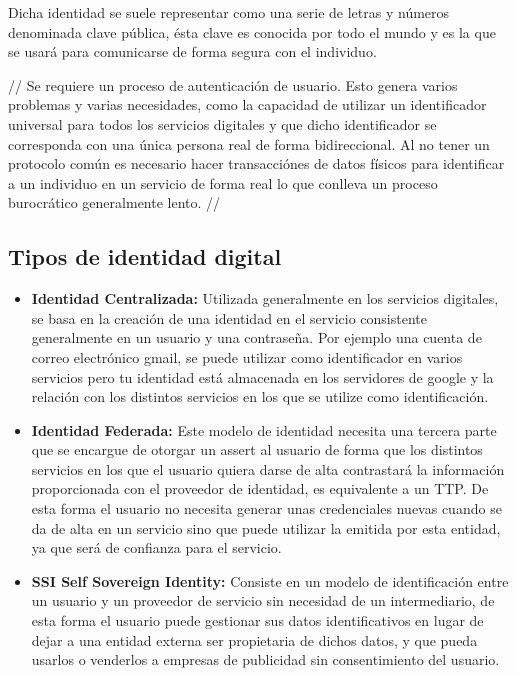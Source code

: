 \documentclass[12pt]{report}
\begin{document}
Dicha identidad se suele representar como una serie de letras y números denominada clave pública, ésta clave es conocida por todo el mundo y es la que se usará para comunicarse de forma segura con el individuo.

//
Se requiere un proceso de autenticación de usuario. 
Esto genera varios problemas y varias necesidades, como la capacidad de utilizar un identificador universal para todos los servicios digitales y que dicho identificador se corresponda con una única persona real de forma bidireccional. Al no tener un protocolo común es necesario hacer transacciónes de datos físicos para identificar a un individuo en un servicio de forma real lo que conlleva un proceso burocrático generalmente lento.
//

\subsection{Tipos de identidad digital}

\begin{itemize}
\item {\textbf{Identidad Centralizada:}}
Utilizada generalmente en los servicios digitales, se basa en la creación de una identidad en el servicio consistente generalmente en un usuario y una contraseña. Por ejemplo una cuenta de correo electrónico gmail, se puede utilizar como identificador en varios servicios pero tu identidad está almacenada en los servidores de google y la relación con los distintos servicios en los que se utilize como identificación.

\item {\textbf{Identidad Federada:}}
Este modelo de identidad necesita una tercera parte que se encargue de otorgar un assert al usuario de forma que los distintos servicios en los que el usuario quiera darse de alta contrastará la información proporcionada con el proveedor de identidad, es equivalente a un TTP. De esta forma el usuario no necesita generar unas credenciales nuevas cuando se da de alta en un servicio sino que puede utilizar la emitida por esta entidad, ya que será de confianza para el servicio.
 
\item{\textbf{SSI Self Sovereign Identity:}}
Consiste en un modelo de identificación entre un usuario y un proveedor de servicio sin necesidad de un intermediario, de esta forma el usuario puede gestionar sus datos identificativos en lugar de dejar a una entidad externa ser propietaria de dichos datos, y que pueda usarlos o venderlos a empresas de publicidad sin consentimiento del usuario.

\end{itemize}
\end{document}
